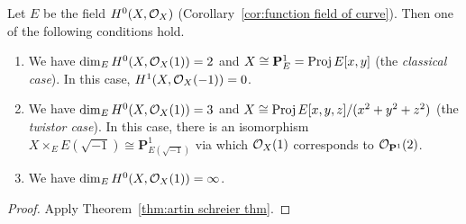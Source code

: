  
\begin{lemma} \label{lem:apply artin-schreier}
Let $E$ be the field $H^0(X, \mathcal{O}_X)$ (Corollary~\ref{cor:function field of curve}).
Then one of the following conditions hold.
\begin{enumerate}
\item[(a)]
We have $\dim_E H^0(X, \mathcal{O}_X(1)) = 2$ and $X \cong \mathbf{P}^1_E =\operatorname{Proj} E[x,y]$ (the \emph{classical case}). In this case, $H^1(X, \mathcal{O}_X(-1)) = 0$.
\item[(b)]
We have $\dim_E H^0(X, \mathcal{O}_X(1)) = 3$ and $X \cong \operatorname{Proj} E[x,y,z]/(x^2+y^2+z^2)$ (the \emph{twistor case}). In this case, there is an isomorphism
$X \times_E E(\sqrt{-1}) \cong \mathbf{P}^1_{E(\sqrt{-1})}$ via which $\mathcal{O}_X(1)$ corresponds to $\mathcal{O}_{\mathbf{P}^1}(2)$.
\item[(c)]
We have $\dim_E H^0(X, \mathcal{O}_X(1)) = \infty$.
\end{enumerate}
\end{lemma}
\begin{proof}
Apply Theorem~\ref{thm:artin schreier thm}.
\end{proof}

